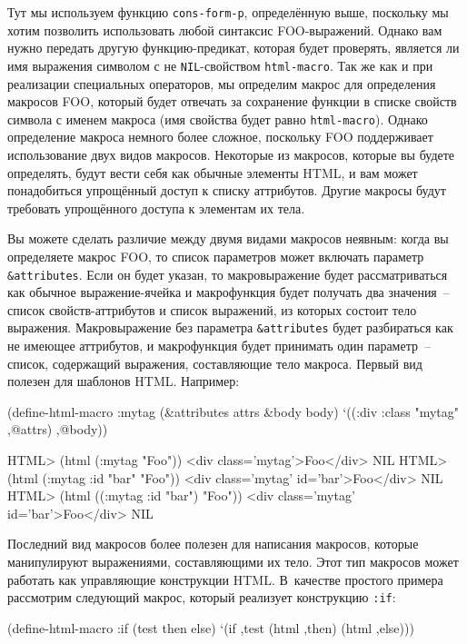 Тут мы используем функцию \lstinline{cons-form-p}, определённую выше, поскольку мы хотим
позволить использовать любой синтаксис FOO-выражений.  Однако вам нужно передать другую
функцию-предикат, которая будет проверять, является ли имя выражения символом с
не \lstinline{NIL}-свойством \lstinline{html-macro}.  Так же как и при реализации специальных
операторов, мы определим макрос для определения макросов FOO, который будет отвечать за
сохранение функции в списке свойств символа с именем макроса (имя свойства будет равно
\lstinline{html-macro}).  Однако определение макроса немного более сложное, поскольку FOO
поддерживает использование двух видов макросов. Некоторые из макросов, которые вы будете
определять, будут вести себя как обычные элементы HTML, и вам может понадобиться упрощённый
доступ к списку аттрибутов.  Другие макросы будут требовать упрощённого доступа к
элементам их тела.

Вы можете сделать различие между двумя видами макросов неявным: когда вы определяете
макрос FOO, то список параметров может включать параметр \lstinline!&attributes!.  Если он
будет указан, то макровыражение будет рассматриваться как обычное выражение-ячейка и
макрофункция будет получать два значения~-- список свойств-аттрибутов и список выражений,
из которых состоит тело выражения.  Макровыражение без параметра \lstinline!&attributes!
будет разбираться как не имеющее аттрибутов, и макрофункция будет принимать один
параметр~-- список, содержащий выражения, составляющие тело макроса.  Первый вид полезен
для шаблонов HTML. Например:

\begin{myverb}
(define-html-macro :mytag (&attributes attrs &body body)
  `((:div :class "mytag" ,@attrs) ,@body))
\end{myverb}

\begin{myverb}
HTML> (html (:mytag "Foo"))
<div class='mytag'>Foo</div>
NIL
HTML> (html (:mytag :id "bar" "Foo"))
<div class='mytag' id='bar'>Foo</div>
NIL
HTML> (html ((:mytag :id "bar") "Foo"))
<div class='mytag' id='bar'>Foo</div>
NIL
\end{myverb}

Последний вид макросов более полезен для написания макросов, которые манипулируют
выражениями, составляющими их тело.  Этот тип макросов может работать как управляющие
конструкции HTML. В~качестве простого примера рассмотрим следующий макрос, который
реализует конструкцию \lstinline{:if}:

\begin{myverb}
(define-html-macro :if (test then else)
  `(if ,test (html ,then) (html ,else)))
\end{myverb}

